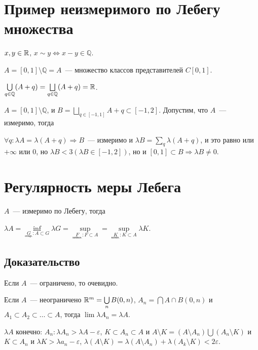 \documentclass{article}
\begin{document}
    \newpage
    
    \section{Пример неизмеримого по Лебегу множества}
    
        $x, y \in \mathbb{R}$, $x \sim y \Longleftrightarrow x - y \in \mathbb{Q}$.
        
        $A = [0, 1] \setminus \mathbb{Q} = A$~--- множество классов представителей $C[0, 1]$.
        
        $\bigcup\limits_{q \in \mathbb{Q}} (A + q) = \bigsqcup\limits_{q \in \mathbb{Q}} (A + q) = \mathbb{R}$.
        
        $A = [0, 1] \setminus \mathbb{Q}$, и $B = \bigsqcup\limits_{q \in [-1, 1]} A + q \subset [-1, 2]$. Допустим, что $A$~--- измеримо, тогда
        
        $\forall q : \lambda A = \lambda (A + q) \Rightarrow B$~--- измеримо и $\lambda B = \sum\limits_{q} \lambda (A + q)$, и это равно или $+\infty$ или $0$, но $\lambda B < 3 (\lambda B \in [-1, 2])$, но и $[0, 1] \subset B \Rightarrow \lambda B \neq 0$.
        
    \newpage
    
    \section{Регулярность меры Лебега}
    
        $A$~--- измеримо по Лебегу, тогда
        
        $\lambda A = \inf\limits_{\underset{\text{откр.}}{G} : A \subset G} \lambda G = \sup\limits_{\underset{\text{замкн.}}{F} : F \subset A} = \sup\limits_{\underset{\text{комп.}}{K} : K \subset A} \lambda K$.
        
        \subsection{Доказательство}
        
            Если $A$~--- ограничено, то очевидно.
            
            Если $A$~--- неограничено $\mathbb{R}^m = \bigcup\limits_{n} B(0, n)$, $A_n = \bigcap A \cap B(0, n)$ и $A_1 \subset A_2 \subset \ldots \subset A$, тогда $\lim \lambda A_n = \lambda A$.
            
            $\lambda A$ конечно: $A_n : \lambda A_n > \lambda A - \varepsilon$, $K \subset A_n \subset A$ и $A \setminus K = (A \setminus A_n) \bigcup (A_n \setminus K)$ и $K \subset A_n$ и $\lambda K > \lambda a_n - \varepsilon$, $\lambda (A \setminus K) = \lambda (A \setminus A_n) + \lambda (A_k \setminus K) < 2 \varepsilon$.
            
\end{document}

